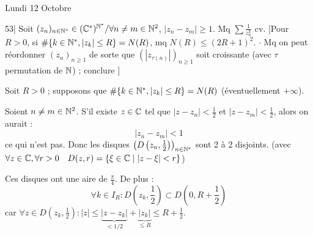 

\begin{statementbox}
Lundi 12 Octobre

53| Soit $(z_n)_{n \in \mathbb N^*} \in (\mathbb C^*)^{\mathbb N^*} / \forall n \neq m \in \mathbb N^2$, $|z_n - z_m| \geq 1$. Mq $\sum \frac{1}{z_n^3}$ cv.
$\big[$Pour $R>0$, si $\#\{k \in \mathbb N^*, |z_k| \leq R\} = N(R)$, mq $N(R) \leq (2R+1)^2$.
$\cdot$ Mq on peut réordonner $(z_n)_{n \geq 1}$ de sorte que $(|z_{\tau(n)}|)_{n \geq 1}$ soit croissante (avec $\tau$ permutation de $\mathbb N$) ; conclure $\big]$
\end{statementbox}

\begin{solution}
\begin{center}
\end{center}

Soit $R>0$ ; supposons que $\#\{k \in \mathbb N^*, |z_k| \leq R\} = N(R)$ (éventuellement $+\infty$).

Soient $n \neq m \in \mathbb N^2$. S'il existe $z \in \mathbb C$ tel que $|z-z_n| < \frac{1}{2}$ et $|z-z_m| < \frac{1}{2}$, alors on aurait :
\[ |z_n-z_m| < 1 \]
ce qui n'est pas. Donc les disques $\left(D\left(z_n, \frac{1}{2}\right)\right)_{n \in \mathbb N^*}$ sont 2 à 2 disjoints.
(avec $\forall z \in \mathbb C, \forall r > 0 \quad D(z,r) = \{\xi \in \mathbb C \mid |z-\xi| < r\}$)

Ces disques ont une aire de $\frac{\pi}{4}$.
De plus :
\[ \forall k \in I_R : D\left(z_k, \frac{1}{2}\right) \subset D\left(0, R+\frac{1}{2}\right) \]
car $\forall z \in D\left(z_k, \frac{1}{2}\right) : |z| \leq \underbrace{|z-z_k|}_{< 1/2} + \underbrace{|z_k|}_{\leq R} \leq R + \frac{1}{2}$.


\end{solution}
